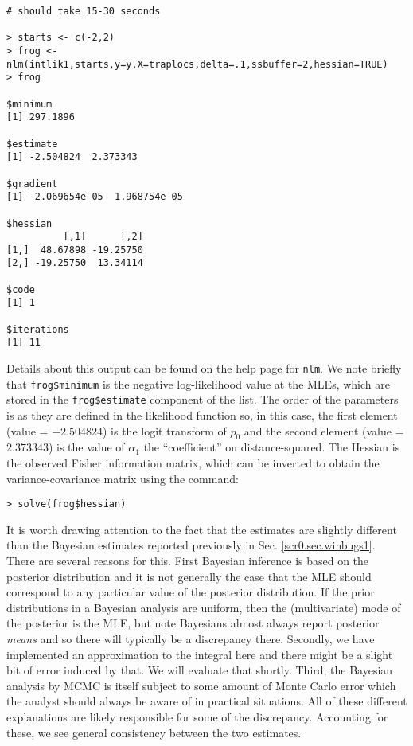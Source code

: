 {\small 
\begin{verbatim}
# should take 15-30 seconds

> starts <- c(-2,2)
> frog <- nlm(intlik1,starts,y=y,X=traplocs,delta=.1,ssbuffer=2,hessian=TRUE)
> frog

$minimum
[1] 297.1896

$estimate
[1] -2.504824  2.373343

$gradient
[1] -2.069654e-05  1.968754e-05

$hessian
          [,1]      [,2]
[1,]  48.67898 -19.25750
[2,] -19.25750  13.34114

$code
[1] 1

$iterations
[1] 11
\end{verbatim}
} 
Details about this output can be found on the help page for
\mbox{\tt nlm}. We note briefly that \mbox{\tt frog\$minimum} is the
negative log-likelihood value at the MLEs, which are stored in the
\mbox{\tt frog\$estimate} component of the list. The order of the
parameters is as they are defined in the likelihood function so, in
this case, the first element (value =  $-2.504824$) is the 
logit transform of $p_0$ and the second element (value = $2.373343$)
is the value of $\alpha_{1}$ the ``coefficient'' on distance-squared.  
The Hessian is the
observed Fisher information matrix, which can be inverted to obtain
the variance-covariance matrix using the command:
\begin{verbatim}
> solve(frog$hessian)
\end{verbatim}

It is worth drawing attention to the fact that the estimates are
slightly different than the Bayesian estimates reported previously in
Sec. \ref{scr0.sec.winbugs1}.  There are several reasons for this.
First Bayesian inference is based on the posterior distribution and it
is not generally the case that the MLE should correspond to any
particular value of the posterior distribution. If the prior
distributions in a Bayesian analysis are uniform, then the
(multivariate) mode of the posterior is the MLE, but note Bayesians
almost always report posterior {\it means} and so there will typically
be a discrepancy there. Secondly, we have implemented an approximation
to the integral here and there might be a slight bit of error induced
by that. We will evaluate that shortly. Third, the Bayesian analysis
by MCMC is itself subject to some amount of Monte Carlo error which
the analyst should always be aware of in practical situations.  All of
these different explanations are likely responsible for some of the
discrepancy. Accounting for these, we see general consistency between
the two estimates.

